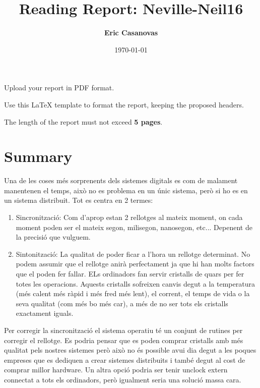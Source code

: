 \documentclass[a4paper, 10pt]{article}
\title{Reading Report: Neville-Neil16}
\author{\textbf{Eric Casanovas}}
\date{\normalsize\today{}}
\begin{document}
\maketitle

\begin{center}
  Upload your report in PDF format.
  
  Use this LaTeX template to format the report, keeping the proposed headers.
  
	The length of the report must not exceed \textbf{5 pages}.
\end{center}

\section{Summary}

Una de les coses més sorprenents dels sistemes digitals es com de malament manentenen el temps, això no es problema en un únic sistema, però si ho es en un sistema distribuit. Tot es centra en 2 termes:
\begin{enumerate}
    \item Sincronització: Com d'aprop estan 2 rellotges al mateix moment, on cada moment poden ser el mateix segon, milisegon, nanosegon, etc... Depenent de la precisió que vulguem.
    \item Sintonització: La qualitat de poder ficar a l'hora un rellotge determinat. No podem assumir que el rellotge anirà perfectament ja que hi han molts factors que el poden fer fallar. ELs ordinadors fan servir cristalls de quars per fer totes les operacions. Aquests cristalls sofreixen canvis degut a la temperatura (més calent més ràpid i més fred més lent), el corrent, el temps de vida o la seva qualitat (com més bo més car), a més de no ser tots els cristalls exactament iguals.
\end{enumerate}

Per corregir la sincronització el sistema operatiu té un conjunt de rutines per corregir el rellotge. Es podria pensar que es poden comprar cristalls amb més qualitat pels nostres sistemes però això no és possible avui dia degut a les poques empreses que es dediquen a crear sistemes distribuits i també degut al cost de comprar millor hardware. Un altra opció podria ser tenir unclock extern connectat a tots els ordinadors, però igualment seria una solució massa cara.
\end{document}
